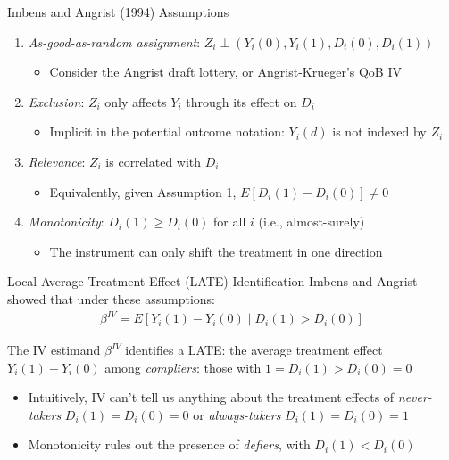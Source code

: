 \documentclass{beamer}
\begin{document}
\begin{frame}{Imbens and Angrist (1994) Assumptions}
\begin{enumerate}
\item \emph{As-good-as-random assignment}: $Z_i\perp (Y_i(0),Y_i(1),D_i(0),D_i(1))$\smallskip
\begin{itemize}
\item Consider the Angrist draft lottery, or Angrist-Krueger's QoB IV
\end{itemize}\medskip\pause{}
\item \emph{Exclusion}: $Z_i$ only affects $Y_i$ through its effect on $D_i$\smallskip
\begin{itemize}
\item Implicit in the potential outcome notation: $Y_i(d)$ is not indexed by $Z_i$
\end{itemize}\medskip\pause{}
\item \emph{Relevance}: $Z_i$ is correlated with $D_i$\smallskip
\begin{itemize}
\item Equivalently, given Assumption 1, $E[D_{i}(1)-D_i(0)]\neq 0$
\end{itemize}\medskip\pause{}
\item \emph{Monotonicity}: $D_{i}(1)\ge D_{i}(0)$ for all $i$ (i.e., almost-surely)\smallskip
\begin{itemize}
\item The instrument can only shift the treatment in one direction
\end{itemize}
\end{enumerate}
\end{frame}

\begin{frame}{Local Average Treatment Effect (LATE) Identification}
Imbens and Angrist showed that under these assumptions:
\begin{align*}
\beta^{IV}=E[Y_i(1)-Y_i(0)\mid D_i(1)>D_i(0)]
\end{align*}
\vspace{-0.6cm}

The IV estimand $\beta^{IV}$ identifies a LATE: the average treatment effect $Y_i(1)-Y_i(0)$ among \emph{compliers}: those with $1=D_i(1)>D_i(0)=0$\smallskip\pause{}
\begin{itemize}
\item Intuitively, IV can't tell us anything about the treatment effects of \emph{never-takers} $D_i(1)=D_i(0)=0$ or \emph{always-takers} $D_i(1)=D_i(0)=1$\smallskip\pause{}
\item Monotonicity rules out the presence of \emph{defiers}, with $D_i(1)<D_i(0)$
\end{itemize}
\end{frame}
\end{document}
